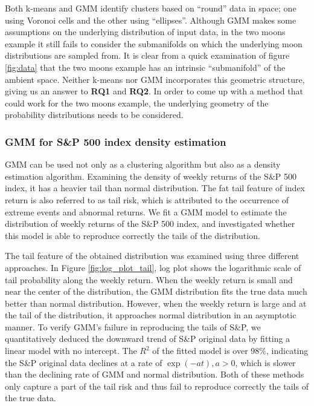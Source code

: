 \documentclass[10pt,journal,compsoc]{IEEEtran}
\begin{document}
    Both k-means and GMM identify clusters based on “round” data in space; one using Voronoi cells and the other using “ellipses”. Although GMM makes some assumptions on the underlying distribution of input data, in the two moons example it still fails to consider the submanifolds on which the underlying moon distributions are sampled from. It is clear from a quick examination of figure \ref{fig:data} that the two moons example has an intrinsic “submanifold” of the ambient space. Neither k-means nor GMM incorporates this geometric structure, giving us an answer to \textbf{RQ1} and \textbf{RQ2}. In order to come up with a method that could work for the two moons example, the underlying geometry of the probability distributions needs to be considered.
    
        
    \subsubsection{GMM for S\&P 500 index density estimation}
    
    GMM can be used not only as a clustering algorithm but also as a density estimation algorithm. Examining the density of weekly returns of the S\&P 500 index, it has a heavier tail than normal distribution. The fat tail feature of index return is also referred to as tail risk, which is attributed to the occurrence of extreme events and abnormal returns. We fit a GMM model to estimate the distribution of weekly returns of the S\&P 500 index, and investigated whether this model is able to reproduce correctly the tails of the distribution.
    
    The tail feature of the obtained distribution was examined using three different approaches. In Figure \ref{fig:log_plot_tail}, log plot shows the logarithmic scale of tail probability along the weekly return. When the weekly return is small and near the center of the distribution, the GMM distribution fits the true data much better than normal distribution. However, when the weekly return is large and at the tail of the distribution, it approaches normal distribution in an asymptotic manner. To verify GMM's failure in reproducing the tails of S\&P, we quantitatively deduced the downward trend of S\&P original data by fitting a linear model with no intercept. The $R^2$ of the fitted model is over 98$\%$, indicating the S\&P original data declines at a rate of $\exp(-at), a>0$, which is slower than the declining rate of GMM and normal distribution. Both of these methods only capture a part of the tail risk and thus fail to reproduce correctly the tails of the true data.
    
\end{document}
